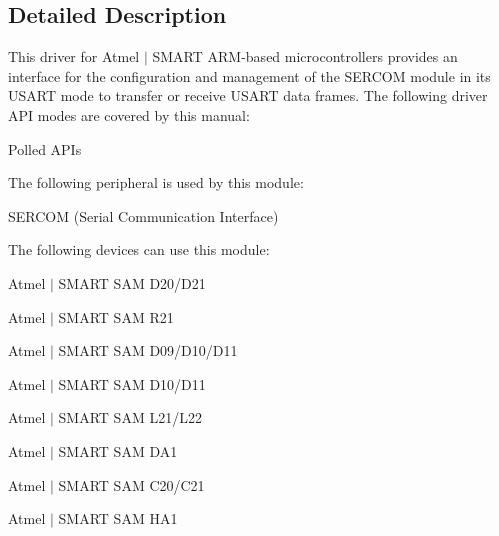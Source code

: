 \subsection{Detailed Description}
This driver for Atmel\textregistered{} $\vert$ S\+M\+A\+R\+T A\+R\+M\textregistered{}-\/based microcontrollers provides an interface for the configuration and management of the S\+E\+R\+C\+O\+M module in its U\+S\+A\+R\+T mode to transfer or receive U\+S\+A\+R\+T data frames. The following driver A\+P\+I modes are covered by this manual\+:


\begin{DoxyItemize}
\item Polled A\+P\+Is
\end{DoxyItemize}

The following peripheral is used by this module\+:
\begin{DoxyItemize}
\item S\+E\+R\+C\+O\+M (Serial Communication Interface)
\end{DoxyItemize}

The following devices can use this module\+:
\begin{DoxyItemize}
\item Atmel $\vert$ S\+M\+A\+R\+T S\+A\+M D20/\+D21
\item Atmel $\vert$ S\+M\+A\+R\+T S\+A\+M R21
\item Atmel $\vert$ S\+M\+A\+R\+T S\+A\+M D09/\+D10/\+D11
\item Atmel $\vert$ S\+M\+A\+R\+T S\+A\+M D10/\+D11
\item Atmel $\vert$ S\+M\+A\+R\+T S\+A\+M L21/\+L22
\item Atmel $\vert$ S\+M\+A\+R\+T S\+A\+M D\+A1
\item Atmel $\vert$ S\+M\+A\+R\+T S\+A\+M C20/\+C21
\item Atmel $\vert$ S\+M\+A\+R\+T S\+A\+M H\+A1
\end{DoxyItemize}

